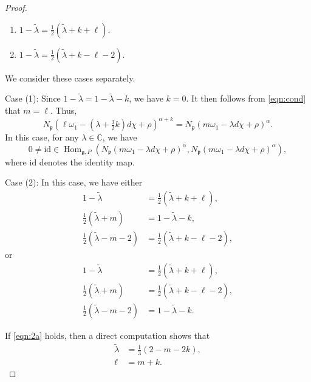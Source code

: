\documentclass[reqno,11pt]{amsart}
\theoremstyle{remark}
\numberwithin{equation}{section}
\newcommand{\ga}{\alpha}
\newcommand{\fg}{{\mathfrak g}}
\newcommand{\fp}{{\mathfrak p}}
\newcommand{\C}{\mathbb{C}}
\newcommand{\Hom}{\operatorname{Hom}}
\newcommand{\wlambda}{\widetilde{\lambda}}
\newcommand{\id}{\mathrm{id}}
\begin{document}
\begin{proof}
\begin{enumerate}[(1)]
\item $1-\wlambda = \tfrac{1}{2}(\wlambda+k+\ell)$.

\vskip 0.05in

\item $1-\wlambda = \tfrac{1}{2}(\wlambda+k-\ell-2)$.

\vskip 0.05in

\end{enumerate}
\noindent
We consider these cases separately.

\vskip 0.1in

\noindent
Case (1): 
Since $1-\wlambda =1-\wlambda-k$,
we have $k=0$.
It then follows from \eqref{eqn:cond} that  $m=\ell$. Thus,
\begin{equation*}
N_\fp(\ell\omega_1 -(\lambda +\tfrac{3}{2}k)d\chi+\rho)^{\ga+k}=
N_\fp(m\omega_1 -\lambda d\chi+\rho)^\ga.
\end{equation*}
In this case, for any $\lambda\in \C$, we have
\begin{equation}\label{eqn:Case1}
0\neq \id \in 
\Hom_{\fg, P}
(
N_\fp(m\omega_1 -\lambda d\chi+\rho)^{\ga},
N_\fp(m\omega_1 -\lambda d\chi+\rho)^\ga
),
\end{equation}
where $\id$ denotes the identity map.
\vskip 0.1in

\noindent
Case (2): 
In this case, we have either
\begin{equation}\label{eqn:2a}
\begin{aligned}
1-\wlambda &= \tfrac{1}{2}(\wlambda+k+\ell),\\
 \tfrac{1}{2}(\wlambda+m) &=1-\wlambda-k,\\
\tfrac{1}{2}(\wlambda-m-2)&=\tfrac{1}{2}(\wlambda+k-\ell-2),
\end{aligned}
\end{equation}
or
\begin{equation}\label{eqn:2b}
\begin{aligned}
1-\wlambda &= \tfrac{1}{2}(\wlambda+k+\ell),\\
 \tfrac{1}{2}(\wlambda+m) &=\tfrac{1}{2}(\wlambda+k-\ell-2),\\
\tfrac{1}{2}(\wlambda-m-2)&=1-\wlambda-k.
\end{aligned}
\end{equation}

If \eqref{eqn:2a} holds, then a direct computation shows that
\begin{equation}\label{eqn:2a2}
\begin{aligned}
\wlambda&=\frac{1}{3}(2-m-2k),\\
\ell&=m+k.
\end{aligned}
\end{equation}


\end{proof}
\end{document}
